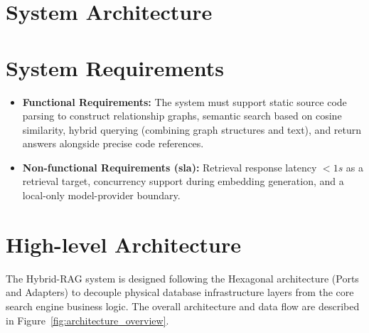 \documentclass[12pt,letterpaper,oneside]{report}
\begin{document}
\section{System Architecture}

\section{System Requirements}
\begin{itemize}
    \item \textbf{Functional Requirements:} The system must support static source code parsing to construct relationship graphs, semantic search based on cosine similarity, hybrid querying (combining graph structures and text), and return answers alongside precise code references.
    \item \textbf{Non-functional Requirements (\gls{sla}):} Retrieval response latency $< 1s$ as a retrieval target, concurrency support during embedding generation, and a local-only model-provider boundary.
\end{itemize}

\section{High-level Architecture}
The Hybrid-RAG system is designed following the Hexagonal architecture (Ports and Adapters) \cite{cockburn2005hexagonal} to decouple physical database infrastructure layers from the core search engine business logic. The overall architecture and data flow are described in Figure~\ref{fig:architecture_overview}.
\end{document}
